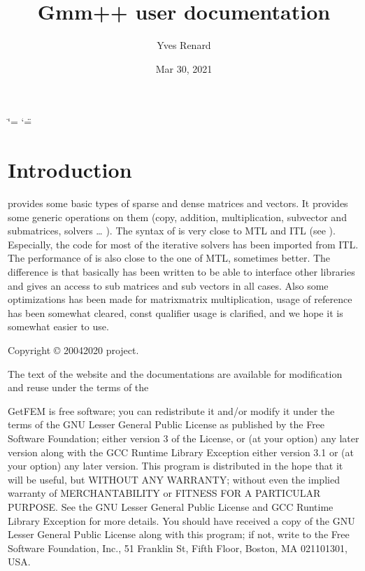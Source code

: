 \documentclass[a4paper,11pt,english]{sphinxmanual}
\title{Gmm++ user documentation}
\date{Mar 30, 2021}
\author{Yves Renard}
\begin{document}
\ifdefined\shorthandoff
  \ifnum\catcode`\=\string=\active\shorthandoff{=}\fi
  \ifnum\catcode`\"=\active{}\fi
\fi

\pagestyle{empty}
\sphinxmaketitle
\pagestyle{plain}
\sphinxtableofcontents
\pagestyle{normal}
\label{\detokenize{gmm/index::doc}}
\begin{figure}[htbp]
\centering

\noindent{}
\end{figure}




\chapter{Introduction}
\label{\detokenize{gmm/intro:introduction}}\label{\detokenize{gmm/intro:gmm-intro}}\label{\detokenize{gmm/intro::doc}}
\sphinxAtStartPar
{} provides some basic types of sparse and dense matrices and vectors. It provides some generic operations on them (copy, addition, multiplication, sub\sphinxhyphen{}vector and sub\sphinxhyphen{}matrices, solvers … ). The syntax of  is very close to MTL and ITL (see ). Especially, the code for most of the iterative solvers has been imported from ITL. The performance of  is also close to the one of MTL, sometimes better. The difference is that basically  has been written to be able to interface other libraries and gives an access to sub matrices and sub vectors in all cases. Also some optimizations has been made for matrix\sphinxhyphen{}matrix multiplication, usage of reference has been somewhat cleared, const qualifier usage is clarified, and we hope it is somewhat easier to use.

\sphinxAtStartPar
Copyright © 2004\sphinxhyphen{}2020  project.

\sphinxAtStartPar
The text of the  website and the documentations are available for modification and reuse under the terms of the 

\sphinxAtStartPar
GetFEM  is  free software;  you  can  redistribute  it  and/or modify it
under  the  terms  of the  GNU  Lesser General Public License as published
by  the  Free Software Foundation;  either version 3 of the License,  or
(at your option) any later version along with the GCC Runtime Library
Exception either version 3.1 or (at your option) any later version.
This program  is  distributed  in  the  hope  that it will be useful,  but
WITHOUT ANY WARRANTY; without even the implied warranty of MERCHANTABILITY
or  FITNESS  FOR  A PARTICULAR PURPOSE.  See the GNU Lesser General Public
License and GCC Runtime Library Exception for more details.
You  should  have received a copy of the GNU Lesser General Public License
along  with  this program;  if not, write to the Free Software Foundation,
Inc., 51 Franklin St, Fifth Floor, Boston, MA  02110\sphinxhyphen{}1301, USA.
\end{document}
